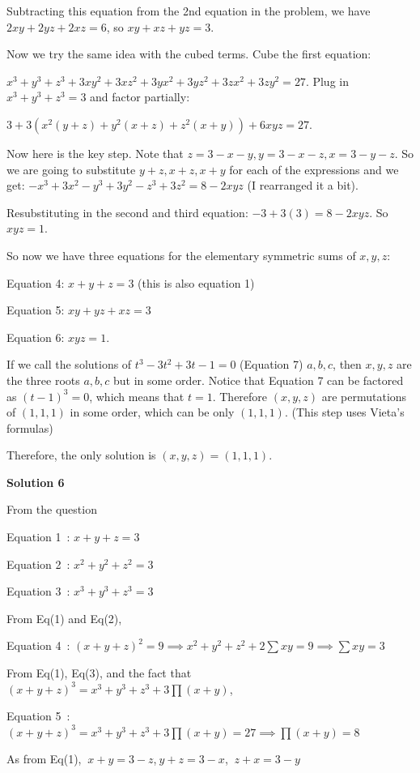 \begin{enumerate}
 Subtracting this equation from the 2nd equation in the problem, we have $2xy+2yz+2xz=6$, so $xy+xz+yz=3$.

 Now we try the same idea with the cubed terms. Cube the first equation:

 $x^3+y^3+z^3+3xy^2+3xz^2+3yx^2+3yz^2+3zx^2+3zy^2=27$. Plug in $x^3+y^3+z^3=3$ and factor partially:

 $3+3(x^2(y+z)+y^2(x+z)+z^2(x+y))+6xyz=27$.

 Now here is the key step. Note that $z=3-x-y, y=3-x-z, x=3-y-z$. So we are going to substitute $y+z, x+z, x+y$ for each of the expressions and we get: $-x^3+3x^2-y^3+3y^2-z^3+3z^2=8-2xyz$ (I rearranged it a bit).

 Resubstituting in the second and third equation: $-3+3(3)=8-2xyz$. So $xyz=1$.

 So now we have three equations for the elementary symmetric sums of $x,y,z$:

 Equation 4: $x+y+z=3$ (this is also equation 1)

 Equation 5: $xy+yz+xz=3$

 Equation 6: $xyz=1$.

 If we call the solutions of $t^3-3t^2+3t-1=0$ (Equation 7) $a,b,c$, then $x,y,z$ are the three roots $a,b,c$ but in some order. Notice that Equation 7 can be factored as $(t-1)^3=0$, which means that $t=1$. Therefore $(x,y,z)$ are permutations of $(1,1,1)$ in some order, which can be only $(1,1,1)$. (This step uses Vieta's formulas)

 Therefore, the only solution is $\boxed{(x,y,z)=(1,1,1)}$.

 



\textbf{Solution 6}

From the question

 Equation 1 : $x+y+z=3$

 Equation 2 : $x^2+y^2+z^2=3$

 Equation 3 : $x^3+y^3+z^3=3$

 From Eq(1) and Eq(2),

 Equation 4 : $(x+y+z)^2=9 \implies x^2+y^2+z^2+2\sum xy = 9 \implies \sum xy = 3$

 From Eq(1), Eq(3), and the fact that $(x+y+z)^3=x^3+y^3+z^3+3\prod(x+y)$,

 Equation 5 : $(x+y+z)^3=x^3+y^3+z^3+3\prod(x+y)= 27 \implies \prod(x+y)=8$

 As from Eq(1),  $\ x+y=3-z$,$\ y+z=3-x$,  $\ z+x = 3- y$


\end{enumerate}
